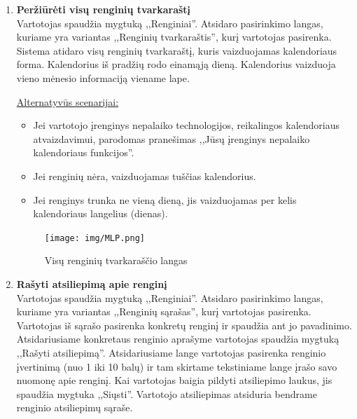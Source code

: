 \documentclass{VUMIFPSkursinis}
\begin{document}
\begin{enumerate} [label = \textbf{U\arabic*.}]
					\underline{Alternatyvūs scenarijai:}
					\begin{itemize}
						\item Jei įvyksta klaida siunčiant užklausą organizatoriui, vartotojui parodomas langas su klaidos aprašymu ir prašymu pabandyti vėliau.
						\item Jei organizatorius nepatvirtina vartotojo dalyvavimo renginyje, sistema išsiunčia vartotojui pranešimą apie atmestą prašymą dalyvauti.
					\end{itemize}

				\begin{figure}[H]
					\centering
					\texttt{[image: img/MLP.png]}
					\caption{Prašymo dalyvauti privačiame renginyje langas}
					\label{fig:prasymas-dalyvauti-privaciame-renginyje}
				\end{figure}
			\item \textbf{Peržiūrėti visų renginių tvarkaraštį} \\
				Vartotojas spaudžia mygtuką ,,Renginiai''.
				Atsidaro pasirinkimo langas, kuriame yra variantas ,,Renginių tvarkaraštis'', kurį vartotojas pasirenka.
				Sistema atidaro visų renginių tvarkaraštį, kuris vaizduojamas kalendoriaus forma.
				Kalendorius iš pradžių rodo einamąją dieną.
				Kalendorius vaizduoja vieno mėnesio informaciją viename lape.
			
				\underline{Alternatyvūs scenarijai:}
				\begin{itemize}
					\item Jei vartotojo įrenginys nepalaiko technologijos, reikalingos kalendoriaus atvaizdavimui, parodomas pranešimas ,,Jūsų įrenginys nepalaiko kalendoriaus funkcijos''.
					\item Jei renginių nėra, vaizduojamas tuščias kalendorius.
					\item Jei renginys trunka ne vieną dieną, jis vaizduojamas per kelis kalendoriaus langelius (dienas).
				\end{itemize}

				\begin{figure}[H]
					\centering
					\texttt{[image: img/MLP.png]}
					\caption{Visų renginių tvarkaraščio langas}
					\label{fig:perziureti-renginiu-tvarkarasti}
				\end{figure}
			\item \textbf{Rašyti atsiliepimą apie renginį} \\
					Vartotojas spaudžia mygtuką ,,Renginiai''.
					Atsidaro pasirinkimo langas, kuriame yra variantas ,,Renginių sąrašas'', kurį vartotojas pasirenka.
					Vartotojas iš sąrašo pasirenka konkretų renginį ir spaudžia ant jo pavadinimo.
					Atsidariusiame konkretaus renginio aprašyme vartotojas spaudžia mygtuką ,,Rašyti atsiliepimą''.
					Atsidariusiame lange vartotojas pasirenka renginio įvertinimą (nuo 1 iki 10 balų) ir tam skirtame tekstiniame lange įrašo savo nuomonę apie renginį.
					Kai vartotojas baigia pildyti atsiliepimo laukus, jis spaudžia mygtuka ,,Siųsti''.
					Vartotojo atsiliepimas atsiduria bendrame renginio atsiliepimų sąraše.


\end{enumerate}
\end{document}
